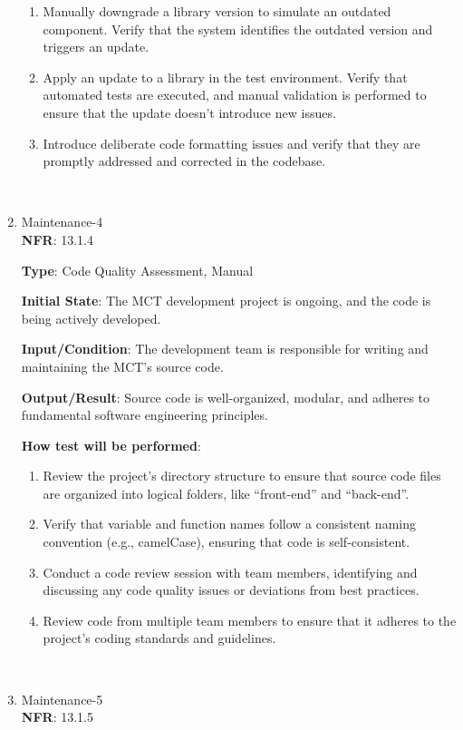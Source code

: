 \documentclass[12pt, titlepage]{article}
\begin{document}
\begin{enumerate}
\begin{enumerate}
    \item Manually downgrade a library version to simulate an outdated component. Verify that the system identifies the outdated version and triggers an update.

    \item Apply an update to a library in the test environment. Verify that automated tests are executed, and manual validation is performed to ensure that the update doesn't introduce new issues.

    \item Introduce deliberate code formatting issues and verify that they are promptly addressed and corrected in the codebase.
\end{enumerate}
\\
 
    \item {Maintenance-4\\}
\textbf{NFR}: 13.1.4

\textbf{Type}: Code Quality Assessment, Manual

\textbf{Initial State}: The MCT development project is ongoing, and the code is being actively developed.

\textbf{Input/Condition}: The development team is responsible for writing and maintaining the MCT's source code.

\textbf{Output/Result}: Source code is well-organized, modular, and adheres to fundamental software engineering principles.

\textbf{How test will be performed}: 
\begin{enumerate}
    \item Review the project's directory structure to ensure that source code files are organized into logical folders, like “front-end” and “back-end”.
    \item Verify that variable and function names follow a consistent naming convention (e.g., camelCase), ensuring that code is self-consistent.
    \item Conduct a code review session with team members, identifying and discussing any code quality issues or deviations from best practices.
    \item Review code from multiple team members to ensure that it adheres to the project's coding standards and guidelines.
\end{enumerate}\\

    \item {Maintenance-5\\}
\textbf{NFR}: 13.1.5


\end{enumerate}
\end{document}
